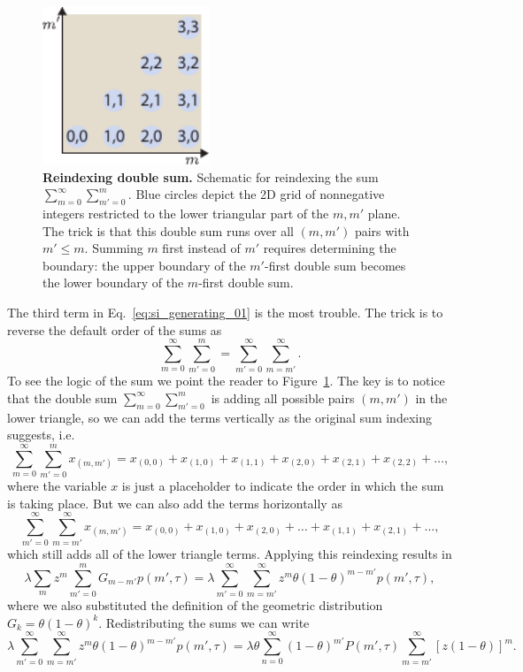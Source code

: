 \begin{figure}[h!]
\centering
\includegraphics[width=5cm]{../../figures/si/figS0X_reindex_sum.pdf}
\caption{\textbf{Reindexing double sum.} Schematic for reindexing the sum
$\sum_{m=0}^\infty \sum_{m'=0}^m$. Blue circles depict the 2D grid of
nonnegative integers restricted to the lower triangular part of the $m, m'$
plane. The trick is that this double sum runs over all $(m, m')$ pairs with
$m'\le m$. Summing $m$ first instead of $m'$ requires determining the
boundary: the upper boundary of the $m'$-first double sum becomes the
lower boundary of the $m$-first double sum.}
\label{figS2:sum_reindex}
\end{figure}

The third term in Eq.~\ref{eq:si_generating_01} is the most trouble. The trick
is to reverse the default order of the sums as
\begin{equation}
\sum_{m=0}^{\infty} \sum_{m'=0}^{m} = \sum_{m'=0}^{\infty} \sum_{m=m'}^{\infty}.
\end{equation}
To see the logic of the sum we point the reader to
Figure~\ref{figS2:sum_reindex}. The key is to notice that the double sum
$\sum_{m=0}^\infty \sum_{m'=0}^m$ is adding all possible pairs $(m, m')$ in the
lower triangle, so we can add the terms vertically as the original sum
indexing suggests, i.e.
\begin{equation}
\sum_{m=0}^{\infty} \sum_{m'=0}^{m} x_{(m, m')}= 
x_{(0, 0)} + x_{(1, 0)} + x_{(1, 1)} + x_{(2, 0)} + x_{(2, 1)} + x_{(2, 2)} + 
\ldots,
\end{equation}
where the variable $x$ is just a placeholder to indicate the order in which the
sum is taking place. But we can also add the terms horizontally as
\begin{equation}
\sum_{m'=0}^{\infty} \sum_{m=m'}^{\infty} x_{(m, m')} =
x_{(0, 0)} + x_{(1, 0)} + x_{(2, 0)} + \ldots + x_{(1,1)} + x_{(2, 1)} + \ldots,
\end{equation}
which still adds all of the lower triangle terms. Applying this reindexing
results in
\begin{equation}
\lambda \sum_m z^m \sum_{m'=0}^m G_{m-m'} p(m', \tau) =
\lambda \sum_{m'=0}^{\infty} \sum_{m=m'}^{\infty} z^m 
\theta (1 - \theta)^{m-m'} p(m', \tau),
\end{equation}
where we also substituted the definition of the geometric distribution $G_{k} =
\theta (1 - \theta)^k$. Redistributing the sums we can write
\begin{equation}
\lambda \sum_{m'=0}^{\infty} \sum_{m=m'}^{\infty} z^m 
\theta (1 - \theta)^{m-m'} p(m', \tau) = 
\lambda \theta \sum_{n=0}^{\infty}(1-\theta)^{m'} P(m', \tau) 
\sum_{m=m'}^{\infty} \left[z (1-\theta)\right]^{m}.
\label{eq:si_generating_02}
\end{equation}

